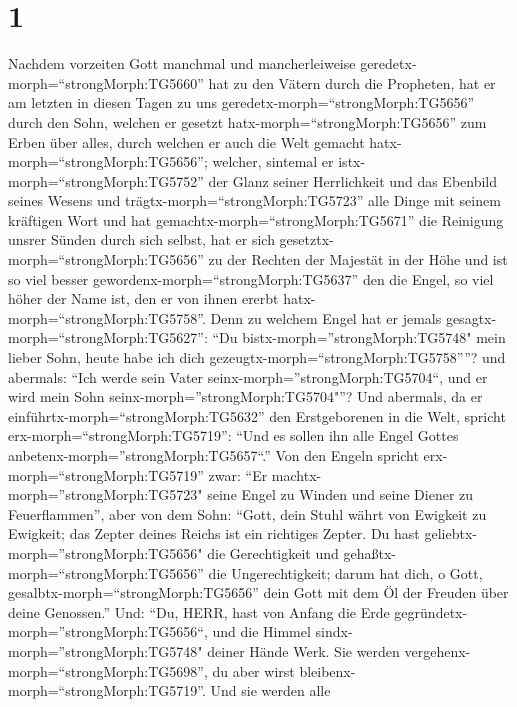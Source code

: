 \hypertarget{section}{%
\section{1}\label{section}}

 Nachdem vorzeiten Gott manchmal und mancherleiweise
geredetx-morph=``strongMorph:TG5660'' hat zu den Vätern durch die
Propheten,  hat er am letzten in diesen Tagen zu uns
geredetx-morph=``strongMorph:TG5656'' durch den Sohn, welchen er gesetzt
hatx-morph=``strongMorph:TG5656'' zum Erben über alles, durch welchen er
auch die Welt gemacht hatx-morph=``strongMorph:TG5656''; 
welcher, sintemal er istx-morph=``strongMorph:TG5752'' der Glanz seiner
Herrlichkeit und das Ebenbild seines Wesens und
trägtx-morph=``strongMorph:TG5723'' alle Dinge mit seinem kräftigen Wort
und hat gemachtx-morph=``strongMorph:TG5671'' die Reinigung unsrer
Sünden durch sich selbst, hat er sich
gesetztx-morph=``strongMorph:TG5656'' zu der Rechten der Majestät in der
Höhe  und ist so viel besser
gewordenx-morph=``strongMorph:TG5637'' den die Engel, so viel höher der
Name ist, den er von ihnen ererbt hatx-morph=``strongMorph:TG5758''.
 Denn zu welchem Engel hat er jemals
gesagtx-morph=``strongMorph:TG5627'': ``Du
bistx-morph=''strongMorph:TG5748" mein lieber Sohn, heute habe ich dich
gezeugtx-morph=``strongMorph:TG5758''''? und abermals: ``Ich werde sein
Vater seinx-morph=''strongMorph:TG5704``, und er wird mein Sohn
seinx-morph=''strongMorph:TG5704"''?  Und abermals, da er
einführtx-morph=``strongMorph:TG5632'' den Erstgeborenen in die Welt,
spricht erx-morph=``strongMorph:TG5719'': ``Und es sollen ihn alle Engel
Gottes anbetenx-morph=''strongMorph:TG5657``.''  Von den
Engeln spricht erx-morph=``strongMorph:TG5719'' zwar: ``Er
machtx-morph=''strongMorph:TG5723" seine Engel zu Winden und seine
Diener zu Feuerflammen'',  aber von dem Sohn: ``Gott, dein
Stuhl währt von Ewigkeit zu Ewigkeit; das Zepter deines Reichs ist ein
richtiges Zepter.  Du hast
geliebtx-morph=''strongMorph:TG5656" die Gerechtigkeit und
gehaßtx-morph=``strongMorph:TG5656'' die Ungerechtigkeit; darum hat
dich, o Gott, gesalbtx-morph=``strongMorph:TG5656'' dein Gott mit dem Öl
der Freuden über deine Genossen.''  Und: ``Du, HERR, hast
von Anfang die Erde gegründetx-morph=''strongMorph:TG5656``, und die
Himmel sindx-morph=''strongMorph:TG5748" deiner Hände Werk.
 Sie werden vergehenx-morph=``strongMorph:TG5698'', du aber
wirst bleibenx-morph=``strongMorph:TG5719''. Und sie werden alle
